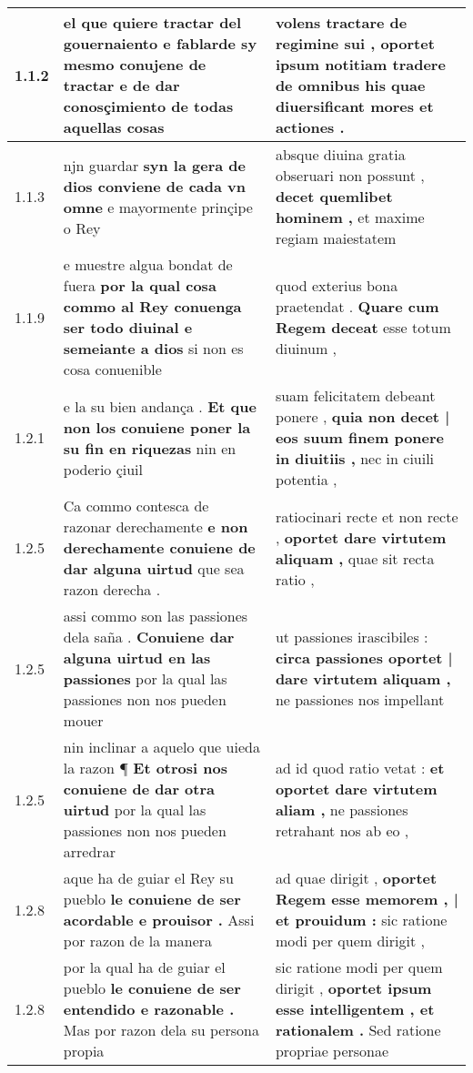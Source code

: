 \begin{tabular}{|p{1cm}|p{6.5cm}|p{6.5cm}|}

\hline
1.1.2 & el que quiere tractar del gouernaiento \textbf{ e fablarde sy mesmo conujene de tractar } e de dar conosçimiento de todas aquellas cosas & volens tractare de regimine sui , \textbf{ oportet ipsum notitiam tradere de omnibus his } quae diuersificant mores et actiones . \\\hline
1.1.3 & njn guardar \textbf{ syn la gera de dios conviene de cada vn omne } e mayormente prinçipe o Rey & absque diuina gratia obseruari non possunt , \textbf{ decet quemlibet hominem , } et maxime regiam maiestatem \\\hline
1.1.9 & e muestre algua bondat de fuera \textbf{ por la qual cosa commo al Rey conuenga ser todo diuinal e semeiante a dios } si non es cosa conuenible & quod exterius bona praetendat . \textbf{ Quare cum Regem deceat } esse totum diuinum , \\\hline
1.2.1 & e la su bien andança . \textbf{ Et que non los conuiene poner la su fin en riquezas } nin en poderio çiuil & suam felicitatem debeant ponere , \textbf{ quia non decet | eos suum finem ponere in diuitiis , } nec in ciuili potentia , \\\hline
1.2.5 & Ca commo contesca de razonar derechamente \textbf{ e non derechamente conuiene de dar alguna uirtud } que sea razon derecha . & ratiocinari recte et non recte , \textbf{ oportet dare virtutem aliquam , } quae sit recta ratio , \\\hline
1.2.5 & assi commo son las passiones dela saña . \textbf{ Conuiene dar alguna uirtud en las passiones } por la qual las passiones non nos pueden mouer & ut passiones irascibiles : \textbf{ circa passiones oportet | dare virtutem aliquam , } ne passiones nos impellant \\\hline
1.2.5 & nin inclinar a aquelo que uieda la razon ¶ \textbf{ Et otrosi nos conuiene de dar otra uirtud } por la qual las passiones non nos pueden arredrar & ad id quod ratio vetat : \textbf{ et oportet dare virtutem aliam , } ne passiones retrahant nos ab eo , \\\hline
1.2.8 & aque ha de guiar el Rey su pueblo \textbf{ le conuiene de ser acordable e prouisor . } Assi por razon de la manera & ad quae dirigit , \textbf{ oportet Regem esse memorem , | et prouidum : } sic ratione modi per quem dirigit , \\\hline
1.2.8 & por la qual ha de guiar el pueblo \textbf{ le conuiene de ser entendido e razonable . } Mas por razon dela su persona propia & sic ratione modi per quem dirigit , \textbf{ oportet ipsum esse intelligentem , et rationalem . } Sed ratione propriae personae \\\hline

\end{tabular}
